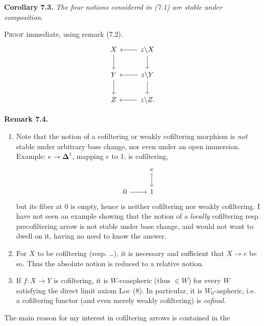\textbf{Corollary 7.3.} \textit{The four notions considered in (7.1) are stable under composition.}

\textsc{Proof} immediate, using remark (7.2).
\[
\begin{tikzcd}
X \arrow[d] & z\backslash X \arrow[l] \arrow[d] \\
Y \arrow[d] & z\backslash Y \arrow[l] \arrow[d] \\
Z & z\backslash Z. \arrow[l]
\end{tikzcd}
\]

\textbf{Remark 7.4.}
\begin{enumerate}
\item[1)] Note that the notion of a cofiltering or weakly cofiltering morphism is \textit{not} stable under arbitrary base change, nor even under an open immersion. Example: $e \longrightarrow \boldsymbol{\Delta}^1$, mapping $e$ to 1, is cofiltering,
\[
\begin{tikzcd}
 & e \arrow[d, mapsto] \\
0 \arrow[r] & 1
\end{tikzcd}
\]
but its fiber at 0 is empty, hence is neither cofiltering nor weakly cofiltering. I have not seen an example showing that the notion of a \textit{locally} cofiltering resp. precofiltering arrow is not stable under base change, and would not want to dwell on it, having no need to know the answer.
\item[2)] For $X$ to be cofiltering (resp. \dots), it is necessary and sufficient that $X \longrightarrow e$ be so. Thus the absolute notion is reduced to a relative notion.
\item[3)] If $f : X \longrightarrow Y$ is cofiltering, it is  $W$-coaspheric (thus $\in W$) for every $W$ satisfying the direct limit axiom Loc (8). In particular, it is $W_0$-aspheric, i.e. a cofiltering functor (and even merely weakly cofiltering) is \textit{cofinal.}
\end{enumerate}
The main reason for my interest in cofiltering arrows is contained in the

